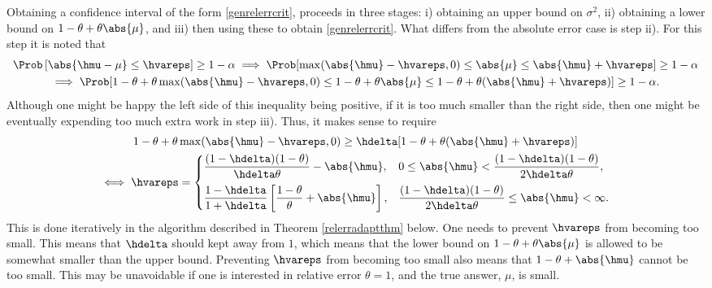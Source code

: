 \documentclass[graybox]{svmult}
\begin{document}
Obtaining a confidence interval of the form \eqref{genrelerrcrit}, proceeds in three stages: i) obtaining an upper bound on $\sigma^2$, ii) obtaining a lower bound on $1-\theta + \theta\abs{\mu}$, and iii) then using these to obtain \eqref{genrelerrcrit}.  What differs from the absolute error case is step ii).  For this step it is noted that
\begin{multline} \label{relerrcritd}
\Prob\left[\abs{\hmu-\mu} \le \hvareps \right] \ge 1-\alpha \implies \Prob[\max(\abs{\hmu}-\hvareps,0) \le \abs{\mu} \le \abs{\hmu}+\hvareps] \ge 1-\alpha \\
\implies \Prob[1-\theta + \theta\max(\abs{\hmu}-\hvareps,0) \le 1-\theta + \theta\abs{\mu} \le 1-\theta + \theta(\abs{\hmu}+\hvareps)] \ge 1-\alpha.
\end{multline}
Although one might be happy the left side of this inequality being positive, if it is too much smaller than the right side, then one might be eventually expending too much extra work in step iii).  Thus, it makes sense to require 
\begin{gather*}
1-\theta + \theta\max(\abs{\hmu}-\hvareps,0) \ge \hdelta [1-\theta + \theta(\abs{\hmu}+\hvareps)] \\
\iff \hvareps = \begin{cases}
\displaystyle \frac{(1-\hdelta)(1-\theta)}{\hdelta \theta} -\abs{\hmu}, & 
\displaystyle 0 \le \abs{\hmu}  < \frac{(1-\hdelta)(1-\theta)}{2 \hdelta \theta},
 \\[2ex]
\displaystyle \frac{1-\hdelta}{1+\hdelta} \left[\frac{1-\theta}{\theta} +\abs{\hmu}\right], & 
\displaystyle \frac{(1-\hdelta)(1-\theta)}{2 \hdelta \theta} \le \abs{\hmu}  < \infty.
\end{cases}
\end{gather*}
This is done iteratively in the algorithm described in Theorem \ref{relerradaptthm} below.  One needs to prevent $\hvareps$ from becoming too small.  This means that $\hdelta$ should kept away from $1$, which means that the lower bound on $1-\theta + \theta\abs{\mu}$ is allowed to be somewhat smaller than the upper bound.  Preventing $\hvareps$ from becoming too small also means that $1-\theta + \abs{\hmu}$ cannot be too small. This may be unavoidable if one is interested in relative error $\theta=1$, and the true answer, $\mu$, is small.
\end{document}
